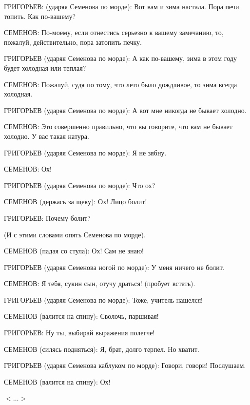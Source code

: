 ГРИГОРЬЕВ: (ударяя Семенова по морде):
Вот вам и зима настала. Пора печи топить.
Как по-вашему?

СЕМЕНОВ: По-моему, если отнестись серьезно к вашему замечанию, то,
пожалуй, действительно, пора затопить печку.

ГРИГОРЬЕВ (ударяя Семенова по морде):
А как по-вашему, зима в этом году будет холодная или теплая?

СЕМЕНОВ:
Пожалуй, судя по тому, что лето было дождливое, то зима всегда холодная.

ГРИГОРЬЕВ (ударяя Семенова по морде):
А вот мне никогда не бывает холодно.

СЕМЕНОВ:
Это совершенно правильно, что вы говорите, что вам не бывает холодно. У вас такая натура.

ГРИГОРЬЕВ (ударяя Семенова по морде):
Я не зябну.

СЕМЕНОВ:
Ох!

ГРИГОРЬЕВ (ударяя Семенова по морде):
Что ох?

СЕМЕНОВ (держась за щеку):
Ох! Лицо болит!

ГРИГОРЬЕВ:
Почему болит?

(И с этими словами опять Семенова по морде).

СЕМЕНОВ (падая со стула):
Ох! Сам не знаю!

ГРИГОРЬЕВ (ударяя Семенова ногой по морде):
У меня ничего не болит.

СЕМЕНОВ:
Я тебя, сукин сын, отучу драться! (пробует встать).

ГРИГОРЬЕВ (ударяя Семенова по морде):
Тоже, учитель нашелся!

СЕМЕНОВ (валится на спину):
Сволочь, паршивая!

ГРИГОРЬЕВ:
Ну ты, выбирай выражения полегче!

СЕМЕНОВ (силясь подняться):
Я, брат, долго терпел. Но хватит.

ГРИГОРЬЕВ (ударяя Семенова каблуком по морде):
Говори, говори! Послушаем.

СЕМЕНОВ (валится на спину):
Ох!

\begin{flushright}
	$<\dots>$
\end{flushright}